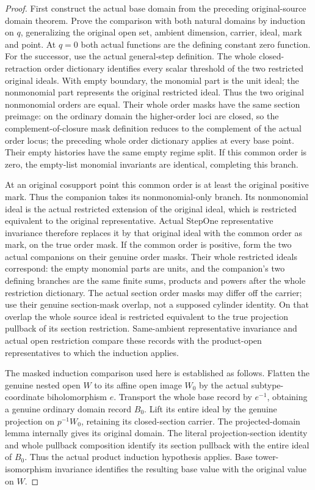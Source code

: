 \begin{proof}
First construct the actual base domain from the preceding original-source
domain theorem. Prove the comparison with both natural domains by induction
on $q$, generalizing the original open set, ambient dimension, carrier,
ideal, mark and point. At $q=0$ both actual functions are the defining constant
zero function. For the successor, use the actual general-step definition.
The whole closed-retraction order dictionary identifies every scalar threshold
of the two restricted original ideals. With empty boundary, the monomial part
is the unit ideal; the nonmonomial part represents the original restricted
ideal. Thus the two original nonmonomial orders are equal. Their whole order masks have the same section preimage: on the ordinary
domain the higher-order loci are closed, so the complement-of-closure mask
definition reduces to the complement of the actual order locus; the preceding
whole order dictionary applies at every base point. Their empty histories
have the same empty regime split. If this common order is zero, the empty-list
monomial invariants are identical, completing this branch.

At an original cosupport point this common order is at least the original
positive mark. Thus the companion takes its nonmonomial-only branch. Its
nonmonomial ideal is the actual restricted extension of the original ideal,
which is restricted equivalent to the original representative. Actual StepOne
representative invariance therefore replaces it by that original ideal with
the common order as mark, on the true order mask. If the common order is positive, form the two actual companions on their genuine
order masks. Their whole restricted ideals correspond: the empty monomial parts
are units, and the companion's two defining branches are the same finite sums,
products and powers after the whole restriction dictionary. The actual section
order masks may differ off the carrier; use their genuine section-mask overlap,
not a supposed cylinder identity. On that overlap the whole source ideal is
restricted equivalent to the true projection pullback of its section restriction.
Same-ambient representative invariance and actual open restriction compare these
records with the product-open representatives to which the induction applies.

The masked induction comparison used here is established as follows. 
Flatten the genuine nested open $W$ to its affine open image $W_0$ by the
actual subtype-coordinate biholomorphism $e$. Transport the whole base record
by $e^{-1}$, obtaining a genuine ordinary domain record $B_0$. Lift its entire
ideal by the genuine projection on $p^{-1}W_0$, retaining its closed-section
carrier. The projected-domain lemma internally gives its original domain.
The literal projection-section identity and whole pullback composition identify
its section pullback with the entire ideal of $B_0$. Thus the actual product
induction hypothesis applies. Base tower-isomorphism invariance identifies the
resulting base value with the original value on $W$.


\end{proof}

